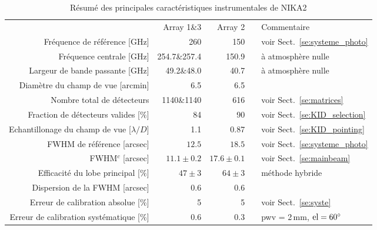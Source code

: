 \begin{table}[!thbp]
  \caption{Résumé des principales caractéristiques instrumentales de NIKA2}
  \label{tab:nika2summary}
  \centering    
  \begin{tabular}{rrrcl}
  \hline\hline
  \noalign{\smallskip}
  & Array 1\&3 & Array 2 & & Commentaire \\
  \noalign{\smallskip}
  \hline
  \noalign{\smallskip}
  Fréquence de référence [GHz]  & 260  & 150   &  & \footnotesize{voir Sect.~\ref{se:systeme_photo}}  \\
  Fréquence centrale [GHz]      &  254.7\&257.4  & 150.9 &  & \footnotesize{à atmosphère nulle}   \\
  Largeur de bande passante  [GHz]     &   49.2\&48.0   & 40.7  &  & \footnotesize{à atmosphère nulle} \\
  \hline
  \noalign{\smallskip}
  Diamètre du champ de vue     [arcmin] &   6.5       &   6.5   &  &  \\  
  Nombre total de détecteurs            &  1140\&1140 &    616  & & \footnotesize{voir Sect.~\ref{se:matrices}}\\
  Fraction de détecteurs valides [$\%$] &  84         &     90  & & \footnotesize{voir Sect.~\ref{se:KID_selection}} \\
  Echantillonage du champ de vue \hspace{3mm} [$\lambda/D$] & 1.1 &  0.87 & & \footnotesize{voir Sect.~\ref{se:KID_pointing}} \\
  \hline
  \noalign{\smallskip}
  FWHM de référence\hspace{3mm} [arcsec]          & $12.5$     &   $18.5$  &  & \footnotesize{voir Sect.~\ref{se:systeme_photo}}\\
  FWHM$^c$\hspace{3mm} [arcsec]    &  $11.1 \pm 0.2$  &  $17.6 \pm 0.1$  & & \footnotesize{voir Sect.~\ref{se:mainbeam}}\\
  Efficacité du lobe principal \hspace{3mm} [$\%$] &  $47 \pm 3$   & $64 \pm 3$  &  & \footnotesize{méthode hybride}\\
  Dispersion de la FWHM [arcsec]  &    0.6        &      0.6        & & \footnotesize{\citet{Adam2018}} \\
  \hline
  \noalign{\smallskip}
  Erreur de calibration absolue [\%]      &   5         & 5 & &  \footnotesize{voir Sect.~\ref{se:syste}}\\
  Erreur de calibration systématique\hspace{3mm}  [\%]      &    0.6        & 0.3 & & \footnotesize{pwv = 2\,mm, $\rm{el} = 60^{\circ}$} \\

\end{tabular}
\end{table}
